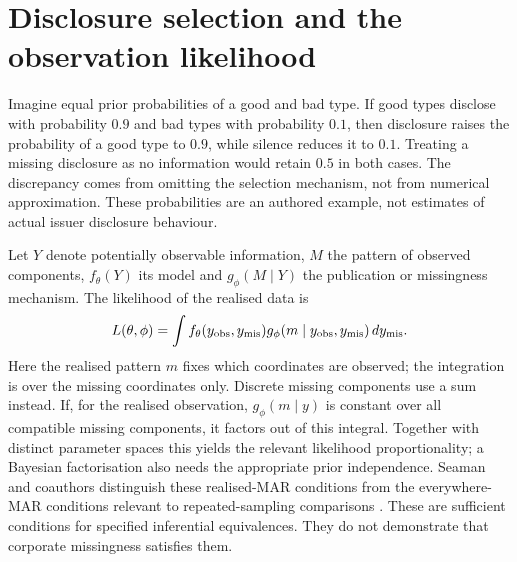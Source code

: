 


\section{Disclosure selection and the observation likelihood}
Imagine equal prior probabilities of a good and bad type. If good types
disclose with probability $0.9$ and bad types with probability $0.1$, then
disclosure raises the probability of a good type to $0.9$, while silence
reduces it to $0.1$. Treating a missing disclosure as no information would
retain $0.5$ in both cases. The discrepancy comes from omitting the selection
mechanism, not from numerical approximation. These probabilities are an
authored example, not estimates of actual issuer disclosure behaviour.

Let $Y$ denote potentially observable information, $M$ the pattern of
observed components, $f_\theta(Y)$ its model and $g_\phi(M\mid Y)$ the
publication or missingness mechanism. The likelihood of the realised data is
\begin{equation}
L(\theta,\phi)=\int
f_\theta(y_{\rm obs},y_{\rm mis})
g_\phi(m\mid y_{\rm obs},y_{\rm mis})\,dy_{\rm mis}.
\end{equation}
Here the realised pattern $m$ fixes which coordinates are observed; the
integration is over the missing coordinates only. Discrete missing components
use a sum instead. If, for the realised observation, $g_\phi(m\mid y)$ is constant over
all compatible missing components, it factors out of this integral. Together
with distinct parameter spaces this yields the relevant likelihood
proportionality; a Bayesian factorisation also needs the appropriate prior
independence. Seaman and coauthors distinguish these realised-MAR conditions
from the everywhere-MAR conditions relevant to repeated-sampling comparisons
\cite[Theorems~1--3, Section~5.4 and Appendix]{litcloseseaman}. These are sufficient
conditions for specified inferential equivalences. They do not demonstrate
that corporate missingness satisfies them.

